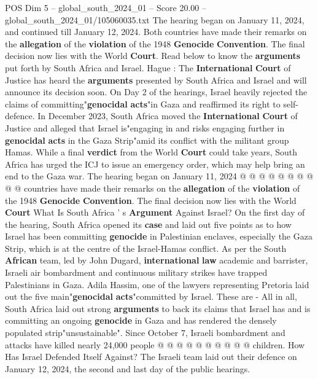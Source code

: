 \begin{textsample}{POS Dim 5 – global\_south\_2024\_01 – Score 20.00 – global\_south\_2024\_01/105060035.txt}  \label{ex:f5_pos_018}
The hearing began on January 11, 2024, and continued till January 12, 2024.
Both countries have made their remarks on the \textbf{allegation} of the \textbf{violation} of the 1948 \textbf{Genocide} \textbf{Convention}.
The final decision now lies with the World \textbf{Court}.
Read below to know the \textbf{arguments} put forth by South Africa and Israel.
Hague : The \textbf{International} \textbf{Court} of Justice has heard the \textbf{arguments} presented by South Africa and Israel and will announce its decision soon.
On Day 2 of the hearings, Israel heavily rejected the claims of committing"\textbf{genocidal} \textbf{acts}"in Gaza and reaffirmed its right to self-defence.
In December 2023, South Africa moved the \textbf{International} \textbf{Court} of Justice and alleged that Israel is"engaging in and risks engaging further in \textbf{genocidal} \textbf{acts} in the Gaza Strip"amid its conflict with the militant group Hamas.
While a final \textbf{verdict} from the World \textbf{Court} could take years, South Africa has urged the ICJ to issue an emergency order, which may help bring an end to the Gaza war.
The hearing began on January 11, 2024 @ @ @ @ @ @ @ @ @ @ countries have made their remarks on the \textbf{allegation} of the \textbf{violation} of the 1948 \textbf{Genocide} \textbf{Convention}.
The final decision now lies with the World \textbf{Court} What Is South Africa ' s \textbf{Argument} Against Israel?
On the first day of the hearing, South Africa opened its \textbf{case} and laid out five points as to how Israel has been committing \textbf{genocide} in Palestinian enclaves, especially the Gaza Strip, which is at the centre of the Israel-Hamas conflict.
As per the South \textbf{African} team, led by John Dugard, \textbf{international} \textbf{law} academic and barrister, Israeli air bombardment and continuous military strikes have trapped Palestinians in Gaza.
Adila Hassim, one of the lawyers representing Pretoria laid out the five main"\textbf{genocidal} \textbf{acts}"committed by Israel.
These are - All in all, South Africa laid out strong \textbf{arguments} to back its claims that Israel has and is committing an ongoing \textbf{genocide} in Gaza and has rendered the densely populated strip"unsustainable".
Since October 7, Israeli bombardment and attacks have killed nearly 24,000 people @ @ @ @ @ @ @ @ @ @ children.
How Has Israel Defended Itself Against?
The Israeli team laid out their defence on January 12, 2024, the second and last day of the public hearings.

\end{textsample}
